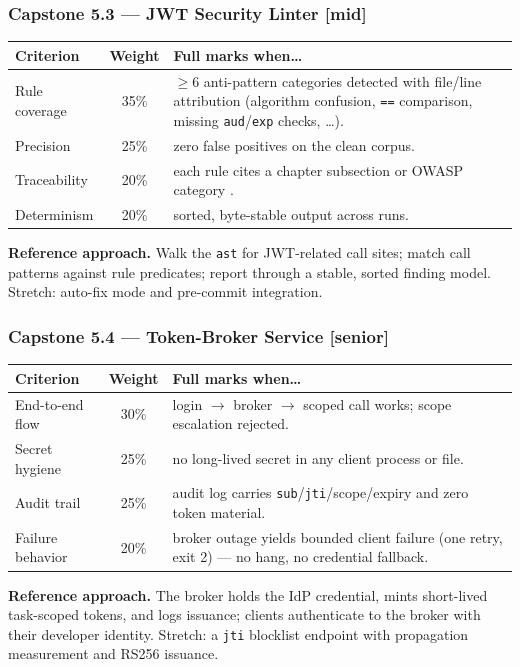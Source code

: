 \subsubsection*{Capstone 5.3 --- JWT Security Linter [mid]}
\begin{center}\small
\begin{tabularx}{\textwidth}{l c X}
\toprule
\textbf{Criterion} & \textbf{Weight} & \textbf{Full marks when\ldots} \\
\midrule
Rule coverage & 35\% & $\geq$6 anti-pattern categories detected with file/line attribution (algorithm confusion, \texttt{==} comparison, missing \texttt{aud}/\texttt{exp} checks, \ldots). \\
Precision & 25\% & zero false positives on the clean corpus. \\
Traceability & 20\% & each rule cites a chapter subsection or OWASP category \cite{owaspapisecurity}. \\
Determinism & 20\% & sorted, byte-stable output across runs. \\
\bottomrule
\end{tabularx}
\end{center}
\textbf{Reference approach.} Walk the \texttt{ast} for JWT-related call
sites; match call patterns against rule predicates; report through a
stable, sorted finding model. Stretch: auto-fix mode and pre-commit
integration.

\subsubsection*{Capstone 5.4 --- Token-Broker Service [senior]}
\begin{center}\small
\begin{tabularx}{\textwidth}{l c X}
\toprule
\textbf{Criterion} & \textbf{Weight} & \textbf{Full marks when\ldots} \\
\midrule
End-to-end flow & 30\% & login $\to$ broker $\to$ scoped call works; scope escalation rejected. \\
Secret hygiene & 25\% & no long-lived secret in any client process or file. \\
Audit trail & 25\% & audit log carries \texttt{sub}/\texttt{jti}/scope/expiry and zero token material. \\
Failure behavior & 20\% & broker outage yields bounded client failure (one retry, exit 2) --- no hang, no credential fallback. \\
\bottomrule
\end{tabularx}
\end{center}
\textbf{Reference approach.} The broker holds the IdP credential, mints
short-lived task-scoped tokens, and logs issuance; clients authenticate to
the broker with their developer identity. Stretch: a \texttt{jti} blocklist
endpoint with propagation measurement and RS256 issuance.


